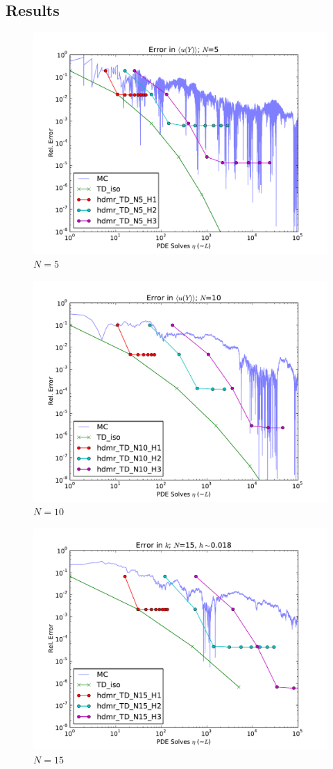 \documentclass[11pt]{article}
\begin{document}
\subsection{Results}
\begin{figure}[H]
\centering
  \includegraphics[width=0.7\linewidth]{hdmrN5}
  \caption{$N=5$}
  \label{geom}
\end{figure}
\begin{figure}[H]
\centering
  \includegraphics[width=0.7\linewidth]{hdmrN10}
  \caption{$N=10$}
  \label{geom}
\end{figure}
\begin{figure}[H]
\centering
  \includegraphics[width=0.7\linewidth]{hdmrN15}
  \caption{$N=15$}
  \label{geom}
\end{figure}
\end{document}
